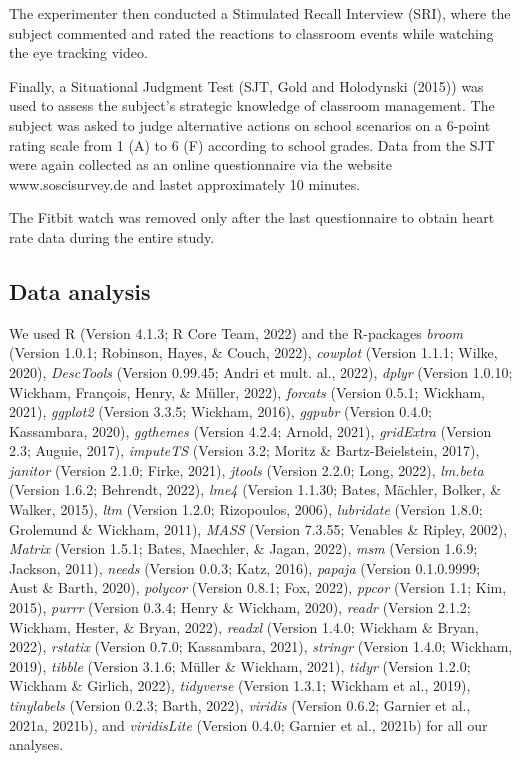 \documentclass[
  man]{apa6}
\begin{document}
The experimenter then conducted a Stimulated Recall Interview (SRI), where the subject commented and rated the reactions to classroom events while watching the eye tracking video.

Finally, a Situational Judgment Test (SJT, Gold and Holodynski (2015)) was used to assess the subject's strategic knowledge of classroom management. The subject was asked to judge alternative actions on school scenarios on a 6-point rating scale from 1 (A) to 6 (F) according to school grades. Data from the SJT were again collected as an online questionnaire via the website www.soscisurvey.de and lastet approximately 10 minutes.

The Fitbit watch was removed only after the last questionnaire to obtain heart rate data during the entire study.

\hypertarget{data-analysis}{%
\subsection{Data analysis}\label{data-analysis}}

We used R (Version 4.1.3; R Core Team, 2022) and the R-packages \emph{broom} (Version 1.0.1; Robinson, Hayes, \& Couch, 2022), \emph{cowplot} (Version 1.1.1; Wilke, 2020), \emph{DescTools} (Version 0.99.45; Andri et mult. al., 2022), \emph{dplyr} (Version 1.0.10; Wickham, François, Henry, \& Müller, 2022), \emph{forcats} (Version 0.5.1; Wickham, 2021), \emph{ggplot2} (Version 3.3.5; Wickham, 2016), \emph{ggpubr} (Version 0.4.0; Kassambara, 2020), \emph{ggthemes} (Version 4.2.4; Arnold, 2021), \emph{gridExtra} (Version 2.3; Auguie, 2017), \emph{imputeTS} (Version 3.2; Moritz \& Bartz-Beielstein, 2017), \emph{janitor} (Version 2.1.0; Firke, 2021), \emph{jtools} (Version 2.2.0; Long, 2022), \emph{lm.beta} (Version 1.6.2; Behrendt, 2022), \emph{lme4} (Version 1.1.30; Bates, Mächler, Bolker, \& Walker, 2015), \emph{ltm} (Version 1.2.0; Rizopoulos, 2006), \emph{lubridate} (Version 1.8.0; Grolemund \& Wickham, 2011), \emph{MASS} (Version 7.3.55; Venables \& Ripley, 2002), \emph{Matrix} (Version 1.5.1; Bates, Maechler, \& Jagan, 2022), \emph{msm} (Version 1.6.9; Jackson, 2011), \emph{needs} (Version 0.0.3; Katz, 2016), \emph{papaja} (Version 0.1.0.9999; Aust \& Barth, 2020), \emph{polycor} (Version 0.8.1; Fox, 2022), \emph{ppcor} (Version 1.1; Kim, 2015), \emph{purrr} (Version 0.3.4; Henry \& Wickham, 2020), \emph{readr} (Version 2.1.2; Wickham, Hester, \& Bryan, 2022), \emph{readxl} (Version 1.4.0; Wickham \& Bryan, 2022), \emph{rstatix} (Version 0.7.0; Kassambara, 2021), \emph{stringr} (Version 1.4.0; Wickham, 2019), \emph{tibble} (Version 3.1.6; Müller \& Wickham, 2021), \emph{tidyr} (Version 1.2.0; Wickham \& Girlich, 2022), \emph{tidyverse} (Version 1.3.1; Wickham et al., 2019), \emph{tinylabels} (Version 0.2.3; Barth, 2022), \emph{viridis} (Version 0.6.2; Garnier et al., 2021a, 2021b), and \emph{viridisLite} (Version 0.4.0; Garnier et al., 2021b) for all our analyses.
\end{document}

